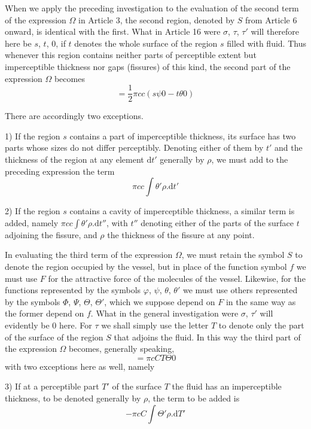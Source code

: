 When we apply the preceding investigation to the evaluation of the second term of the expression $\Omega$ in Article 3, the second region, denoted by $S$ from Article 6 onward, is identical with the first. What in Article 16 were $\sigma$, $\tau$, $\tau'$ will therefore here be $s$, $t$, $0$, if $t$ denotes the whole surface of the region $s$ filled with fluid. Thus whenever this region contains neither parts of perceptible extent but imperceptible thickness nor gaps (fissures) of this kind, the second part of the expression $\Omega$ becomes
\[
=\frac12\pi cc(s\psi0-t\theta0)
\]

There are accordingly two exceptions.

1) If the region $s$ contains a part of imperceptible thickness, its surface has two parts whose sizes do not differ perceptibly. Denoting either of them by $t'$ and the thickness of the region at any element $\mathrm{d}t'$ generally by $\rho$, we must add to the preceding expression the term
\[
\pi cc\int\theta'\rho.\mathrm{d}t'
\]

2) If the region $s$ contains a cavity of imperceptible thickness, a similar term is added, namely $\pi cc\int\theta'\rho.\mathrm{d}t''$, with $t''$ denoting either of the parts of the surface $t$ adjoining the fissure, and $\rho$ the thickness of the fissure at any point.

In evaluating the third term of the expression $\Omega$, we must retain the symbol $S$ to denote the region occupied by the vessel, but in place of the function symbol $f$ we must use $F$ for the attractive force of the molecules of the vessel. Likewise, for the functions represented by the symbols $\varphi$, $\psi$, $\theta$, $\theta'$ we must use others represented by the symbols $\Phi$, $\Psi$, $\Theta$, $\Theta'$, which we suppose depend on $F$ in the same way as the former depend on $f$. What in the general investigation were $\sigma$, $\tau'$ will evidently be $0$ here. For $\tau$ we shall simply use the letter $T$ to denote only the part of the surface of the region $S$ that adjoins the fluid. In this way the third part of the expression $\Omega$ becomes, generally speaking,
\[
=\pi cCT\Theta0
\]
with two exceptions here as well, namely

3) If at a perceptible part $T'$ of the surface $T$ the fluid has an imperceptible thickness, to be denoted generally by $\rho$, the term to be added is
\[
-\pi cC\int\Theta'\rho.\mathrm{d}T'
\]

